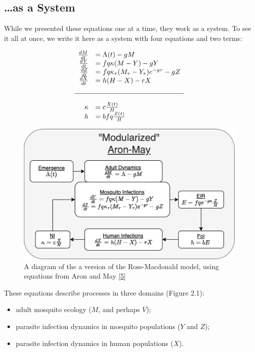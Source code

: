 \documentclass[
]{book}
\begin{document}
\hypertarget{as-a-system}{%
\subsection{\ldots as a System}\label{as-a-system}}

While we presented these equations one at a time, they work as a system. To see it all at once, we write it here as a system with four equations and two terms:

\begin{equation}
\begin{array}{rl}
\frac{dM}{dt} &= \Lambda(t) - g M \\
\frac{dY}{dt} &= fq\kappa(M-Y) - g Y \\
\frac{dZ}{dt} &= fq\kappa_\tau(M_\tau-Y_\tau)e^{-g\tau} - g Z \\
\frac{dX}{dt} &= h (H-X) - rX  \\ \\ \hline \\ 
\kappa &= c \frac{X(t)}{H} \\
h &= b fq \frac{Z(t)}{H} \\
\end{array}
\end{equation}

\begin{figure}
\centering
\includegraphics{../RAMP-Model-Library/Figures/AronMay.png}
\caption{A diagram of the a version of the Ross-Macdonald model, using equations from Aron and May {[}\protect\hyperlink{ref-AronJL1982PopulationDynamics}{5}{]}}
\end{figure}

These equations describe processes in three domains (Figure 2.1):

\begin{itemize}
\item
  adult mosquito ecology (\(M\), and perhaps \(V\));
\item
  parasite infection dynamics in mosquito populations (\(Y\) and \(Z\));
\item
  parasite infection dynamics in human populations (\(X\)).
\end{itemize}
\end{document}

